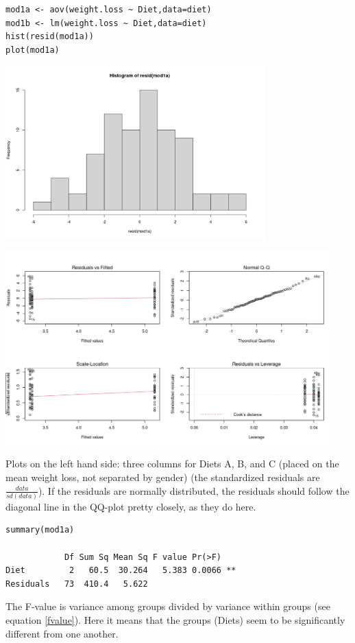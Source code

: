 \documentclass{article}
\begin{document}
\begin{lstlisting}
mod1a <- aov(weight.loss ~ Diet,data=diet)
mod1b <- lm(weight.loss ~ Diet,data=diet)
hist(resid(mod1a))
plot(mod1a)
\end{lstlisting}

\begin{center}
    \includegraphics[width = 0.75\textwidth]{lab2/hist_aov_residuals.png}
\end{center}
\begin{center}
    \includegraphics[width = 0.95\textwidth]{lab2/aov_plot.png}
\end{center}
Plots on the left hand side: three columns for Diets A, B, and C (placed on the mean weight loss, not separated by gender) (the standardized residuals are $ \frac{data}{sd(data)}$). If the residuals are normally distributed, the residuals should follow the diagonal line in the QQ-plot pretty closely, as they do here.

\begin{lstlisting}
summary(mod1a)

            Df Sum Sq Mean Sq F value Pr(>F)   
Diet         2   60.5  30.264   5.383 0.0066 **
Residuals   73  410.4   5.622                  
\end{lstlisting}
The F-value is variance among groups divided by variance within groups (see equation \ref{fvalue}). Here it means that the groups (Diets) seem to be significantly different from one another.
\end{document}
